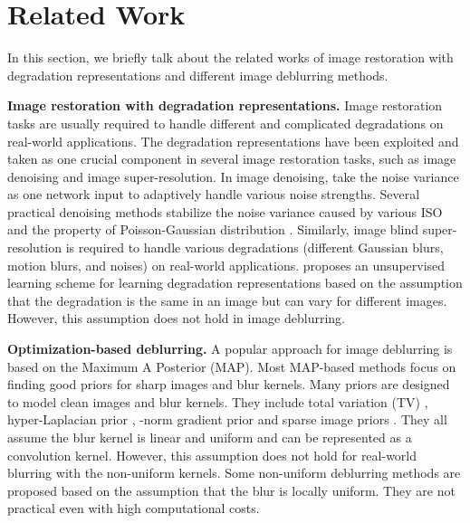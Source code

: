 \documentclass[runningheads]{llncs}
\begin{document}
\section{Related Work}
In this section, we briefly talk about the related works of image restoration with degradation representations and different image deblurring methods.

\noindent\textbf{Image restoration with degradation representations.}
Image restoration tasks are usually required to handle different and complicated degradations on real-world applications. 
The degradation representations have been exploited and taken as one crucial component in several image restoration tasks, such as image denoising and image super-resolution. In image denoising, \cite{zhang2018ffdnet,MildenhallKPN18,Guo2019Cbdnet} take the noise variance as one network input to adaptively handle various noise strengths. Several practical denoising methods stabilize the noise variance caused by various ISO \cite{PMRID} and the property of Poisson-Gaussian distribution \cite{GAT,Li2022Efficient}.
Similarly, image blind super-resolution is required to handle various degradations (different Gaussian blurs, motion blurs, and noises) on real-world applications. 
\cite{unsupervised_degradation} proposes an unsupervised learning scheme for learning degradation representations based on the assumption that the degradation is the same in an image but can vary for different images. However, this assumption does not hold in image deblurring. 

\noindent\textbf{Optimization-based deblurring.}
A popular approach for image deblurring is based on the Maximum A Posterior (MAP). Most MAP-based methods focus on finding good priors for sharp images and blur kernels. 
Many priors are designed to model clean images and blur kernels. They include total variation (TV) \cite{total_variation}, hyper-Laplacian prior \cite{hyper_laplacian}, -norm gradient prior \cite{L0_norm} and sparse image priors \cite{sparse_prior}.
They all assume the blur kernel is linear and uniform and can be represented as a convolution kernel. However, this assumption does not hold for real-world blurring with the non-uniform kernels. Some non-uniform deblurring methods \cite{non-uniform-deblurring,restore_spatially_variant,rotational_motion_deblurring,removing_non_uniform_motion} are proposed based on the assumption that the blur is locally uniform. They are not practical even with high computational costs.
\end{document}
